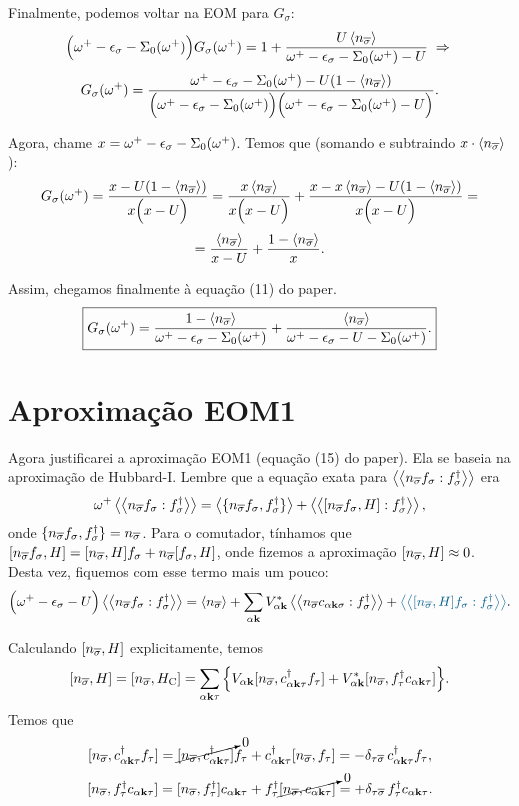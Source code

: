 \documentclass[a4paper,fleqn,12pt]{article}
\begin{document}
Finalmente, podemos voltar na EOM para $G_\sigma$:
$$
\Big(
\omega^+ - \eps_\sigma - \Sigma_0(\omega^+)
\Big) G_\sigma(\omega^+)
= 1 + \frac{U \ev{n_{\cc{\sigma}}}}{\omega^+ - \eps_\sigma - \Sigma_0(\omega^+) - U}
\implies
$$
$$
G_\sigma(\omega^+) =
\frac{\omega^+ - \eps_\sigma - \Sigma_0(\omega^+) - U (1 - \ev{n_{\cc{\sigma}}})}
{\Big(\omega^+ - \eps_\sigma - \Sigma_0(\omega^+)\Big)\Big(\omega^+ - \eps_\sigma - \Sigma_0(\omega^+) - U\Big)}.
$$

Agora, chame $x = \omega^+ - \epsilon_\sigma - \Sigma_0(\omega^+)$. Temos que (somando e subtraindo $x \cdot \ev{n_{\cc{\sigma}}}$):
$$
G_\sigma(\omega^+) =
\frac{x - U (1 - \ev{n_{\cc{\sigma}}})}
{x\Big(x - U\Big)} =
\frac{x \ev{n_{\cc{\sigma}}}}{x\Big(x - U\Big)} +
\frac{x - x \ev{n_{\cc{\sigma}} } - U (1 - \ev{n_{\cc{\sigma}}})}
{x\Big(x - U\Big)} =
$$
$$
= \frac{\ev{n_{\cc{\sigma}}}}{{x - U}} + \frac{1 - \ev{n_{\cc{\sigma}}}}{x}.
$$

Assim, chegamos finalmente à equação (11) do paper.
$$
\boxed{
G_\sigma(\omega^+) =
\frac{1 - \ev{n_{\cc{\sigma}}}}{\omega^+ - \eps_\sigma - \Sigma_0(\omega^+)} +
\frac{\ev{n_{\cc{\sigma}}}}{{\omega^+ - \eps_\sigma - U - \Sigma_0(\omega^+)}}.
}
$$

\section{Aproximação EOM1}

Agora justificarei a aproximação EOM1 (equação (15) do paper). Ela se baseia na aproximação de Hubbard-I. Lembre que a equação exata para $\gf{n_{\cc{\sigma}} f_\sigma}{f_\sigma^\dagger}$ era
$$
\omega^+ \gf{n_{\cc{\sigma}} f_\sigma}{f_\sigma^\dagger} =
\ev{\{n_{\cc{\sigma}} f_\sigma, f_\sigma^\dagger\}} +
\gf{[n_{\cc{\sigma}} f_\sigma, H]}{f_\sigma^\dagger},
$$
onde $\{n_{\overline{\sigma}} f_\sigma, f_\sigma^\dagger\} = n_{\overline{\sigma}}$. Para o comutador, tínhamos que $[n_{\overline{\sigma}} f_\sigma, H] = [n_{\overline{\sigma}}, H] f_\sigma + n_{\overline{\sigma}} [f_\sigma, H]$, onde fizemos a aproximação $[n_{\overline{\sigma}}, H] \approx 0$. Desta vez, fiquemos com esse termo mais um pouco:
$$
\Big(
\omega^+ - \eps_\sigma - U
\Big) \gf{n_{\cc{\sigma}} f_\sigma}{f_\sigma^\dagger} =
\ev{n_{\cc{\sigma}}} +
\sum_{\alpha \k} V_{\alpha \k}^*
\gf{n_{\cc{\sigma}} c_{\alpha \k \sigma}}{f_\sigma^\dagger} +
\textcolor{MidnightBlue}{\gf{[n_{\cc{\sigma}}, H] f_\sigma}{f_\sigma^\dagger}}.
$$

Calculando $[n_{\overline{\sigma}}, H]$ explicitamente, temos
$$
[n_{\overline{\sigma}}, H] = [n_{\overline{\sigma}}, H_{\text{C}}] =
\sum_{\alpha \vb{k} \tau} \Big\{
V_{\alpha \vb{k}} [n_{\overline{\sigma}}, c_{\alpha \vb{k} \tau}^\dagger f_\tau] +
V_{\alpha \vb{k}}^* [n_{\overline{\sigma}}, f_\tau^\dagger c_{\alpha \vb{k} \tau}]
\Big\}.
$$
Temos que
$$
[n_{\overline{\sigma}}, c_{\alpha \vb{k} \tau}^\dagger f_\tau] =
\cancelto{0}{[n_{\overline{\sigma}}, c_{\alpha \vb{k} \tau}^\dagger]} f_\tau +
c_{\alpha \vb{k} \tau}^\dagger
[n_{\overline{\sigma}}, f_\tau] =
- \delta_{\tau \overline{\sigma}} \, c_{\alpha \vb{k} \tau}^\dagger f_{\tau},
$$
$$
[n_{\overline{\sigma}}, f_\tau^\dagger c_{\alpha \vb{k} \tau}] =
[n_{\overline{\sigma}}, f_\tau^\dagger] c_{\alpha \vb{k} \tau} +
f_\tau^\dagger \cancelto{0}{[n_{\overline{\sigma}}, c_{\alpha \vb{k} \tau}]} =
+ \delta_{\tau \overline{\sigma}} \, f_{\tau}^\dagger c_{\alpha \vb{k} \tau}.
$$
\end{document}
